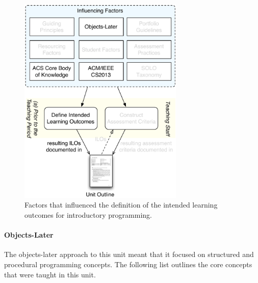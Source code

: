 \begin{figure}[htbp]
	\centering
	\includegraphics[width=0.7\textwidth]{ILOFactors}
	\caption{Factors that influenced the definition of the intended learning outcomes for introductory programming. }
	\label{fig:defining_ilos_intro}
\end{figure}

\paragraph{Objects-Later} %
\label{par:intro:objects_later}
The objects-later approach to this unit meant that it focused on structured and procedural programming concepts. The following list outlines the core concepts that were taught in this unit.

